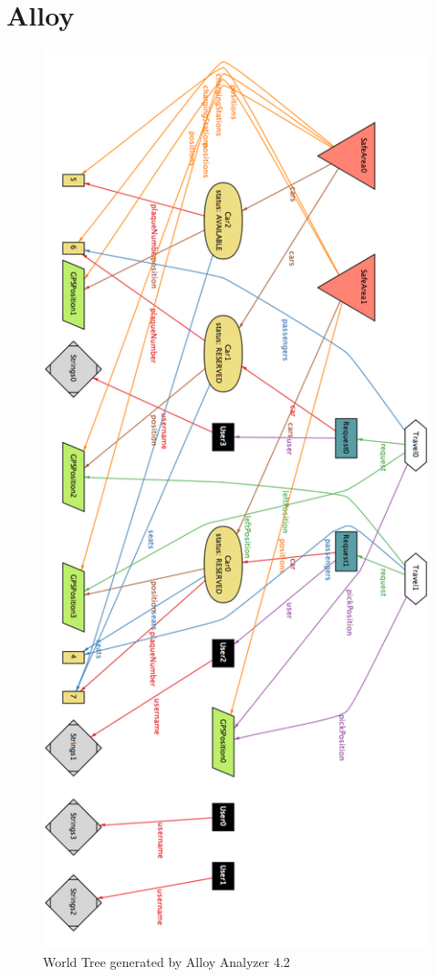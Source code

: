 \section{Alloy}
	
	
	\begin{figure}[H]	
		\centering
		\includegraphics[scale=0.35]{img/alloyworld}
		\caption{World Tree generated by Alloy Analyzer 4.2}
	\end{figure}
